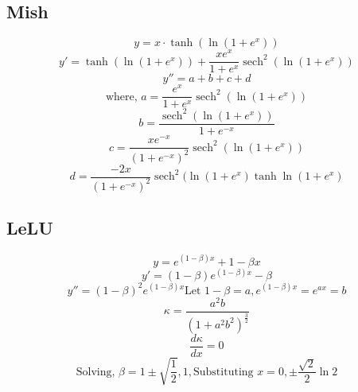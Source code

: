 \documentclass[manuscript, screen, review]{jair}
\begin{document}
\subsection{Mish}\label{app:mish}
\begin{displaymath}
y = x \cdot \tanh\!\left(\ln(1 + e^{x})\right)
\end{displaymath}
\begin{displaymath}
y' = \tanh{(\ln{(1 + e^x)})} + \frac{xe^x}{1 + e^x}\operatorname{sech}^2(\ln{(1 + e^x)})
\end{displaymath}
\begin{displaymath}
  y'' = a + b + c + d
\end{displaymath}
\begin{displaymath}
  \text{where, } a = \frac{e^x}{1 + e^x}\operatorname{sech}^2(\ln{(1 + e^x)})
\end{displaymath}
\begin{displaymath}
  b = \frac{\operatorname{sech}^2(\ln{(1 + e^x)})}{1+e^{-x}} 
\end{displaymath}
\begin{displaymath}
  c = \frac{xe^{-x}}{(1 + e^{-x})^2} \operatorname{sech}^2(\ln{(1 + e^x)})
\end{displaymath}
\begin{displaymath}
  d = \frac{-2x}{(1 + e^{-x})^2} \operatorname{sech}^2(\ln{(1 + e^x)} \tanh{\ln{(1 + e^x)}}
\end{displaymath}

\subsection{LeLU}\label{app:LeLU}

\begin{displaymath}
y = e^{(1 - \beta)x} + 1 - \beta x
\end{displaymath}
\begin{displaymath}
y' = (1 - \beta)e^{(1 - \beta)x} - \beta
\end{displaymath}
\begin{displaymath}
y'' = (1 - \beta)^2e^{(1 - \beta)x}
\text{Let }1 - \beta = a, e^{(1 - \beta)x} = e^{ax} = b
\end{displaymath}
\begin{displaymath}
\kappa = \frac{a^2b}{(1 + a^2b^{2})^\frac{3}{2}}
\end{displaymath}
\begin{displaymath}
\frac{d \kappa}{dx} = 0
\end{displaymath}
\begin{displaymath}
\text{Solving, }\beta = 1 \pm \sqrt{\frac{1}{2}}, 1, \text{Substituting }x = 0, \pm \frac{\sqrt{2}}{2}\ln2
\end{displaymath}
\end{document}

